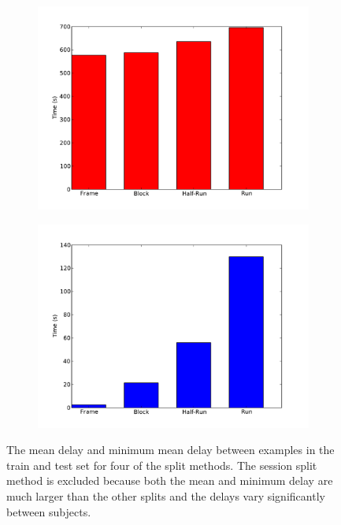 \documentclass[preprint,5p,authoryear]{elsarticle}
\begin{document}
\begin{figure}
\centering
\begin{subfigure}{0.4\textwidth}
\centering
\includegraphics[width=\textwidth]{figures/mean-delay-graph}
\caption{}
\label{fig:mean-delay-graph}
\end{subfigure}
\begin{subfigure}{0.4\textwidth}
\centering
\includegraphics[width=\textwidth]{figures/min-delay-graph}
\caption{}
\label{fig:min-delay-graph}
\end{subfigure}
\caption{The  mean delay and  minimum mean delay between examples in the train and test set for four of the split methods. 
The session split method is excluded because both the mean and minimum delay are much larger than the other splits and the delays vary significantly between subjects.}
\end{figure}
\end{document}
